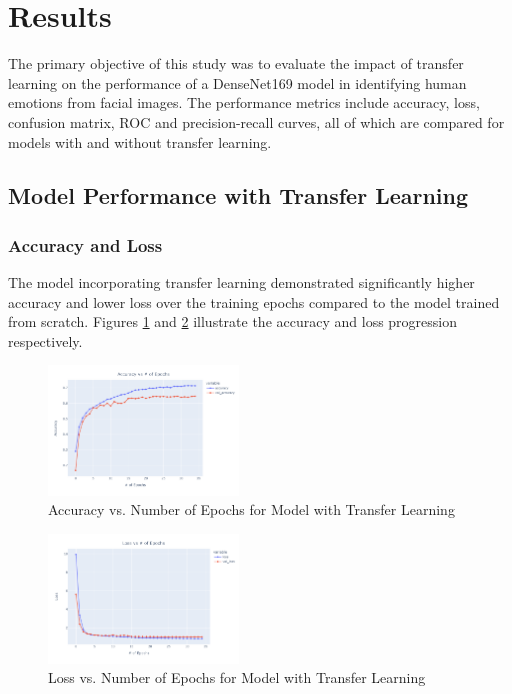 \documentclass[conference]{IEEEtran}
\begin{document}

\section{Results}
The primary objective of this study was to evaluate the impact of transfer learning on the performance of a DenseNet169 model in identifying human emotions from facial images. The performance metrics include accuracy, loss, confusion matrix, ROC and precision-recall curves, all of which are compared for models with and without transfer learning.

\subsection{Model Performance with Transfer Learning}


\subsubsection{Accuracy and Loss}
The model incorporating transfer learning demonstrated significantly higher accuracy and lower loss over the training epochs compared to the model trained from scratch. Figures \ref{fig:accuracy_tl} and \ref{fig:loss_tl} illustrate the accuracy and loss progression respectively.

\begin{figure}[H]
    \centering
    \includegraphics[width=0.45\textwidth]{Figures/accuracyvsnumepochs.png}
    \caption{Accuracy vs. Number of Epochs for Model with Transfer Learning}
    \label{fig:accuracy_tl}
\end{figure}

\begin{figure}[H]
    \centering
    \includegraphics[width=0.45\textwidth]{Figures/loss vs numepochs.png}
    \caption{Loss vs. Number of Epochs for Model with Transfer Learning}
    \label{fig:loss_tl}
\end{figure}
\end{document}
